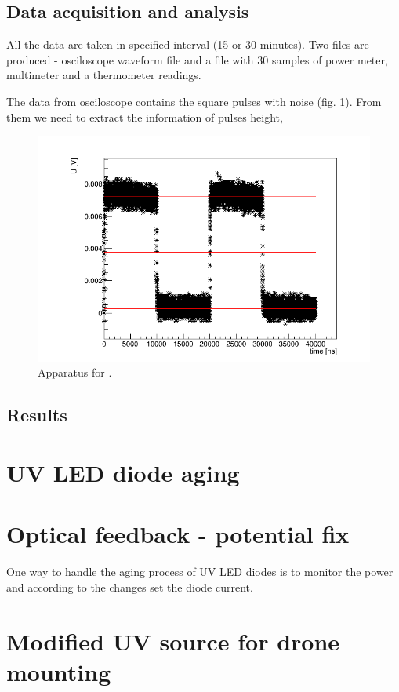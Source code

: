 \subsection{Data acquisition and analysis}
All the data are taken in specified interval (15 or 30 minutes). Two files are produced - osciloscope waveform file and a file with 30 samples of power meter, multimeter and a thermometer readings.
\par
The data from osciloscope contains the square pulses with noise (fig. \ref{pulse}). From them we need to extract the information of pulses height, 

 \begin{figure}[H]
 \centering
 \includegraphics[width=150mm]{./pictures/PMTPulse}
 \caption{Apparatus for .}
 \label{pulse}
\end{figure}



\subsection{Results}

\section{UV LED diode aging}

\section{Optical feedback - potential fix}
One way to handle the aging process of UV LED diodes is to monitor the power and according to the changes set the diode current. 



\section{Modified UV source for drone mounting}



